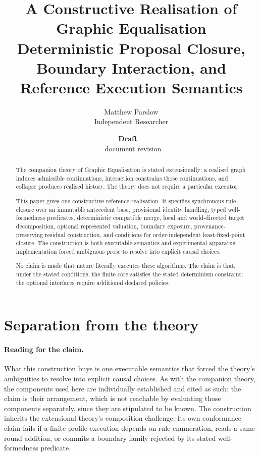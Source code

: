 \documentclass[11pt,a4paper]{article}
\title{A Constructive Realisation of Graphic Equalisation\\
\large Deterministic Proposal Closure, Boundary Interaction, and Reference Execution Semantics}
\author{Matthew Parslow\\Independent Researcher}
\date{\textbf{Draft \textemdash\ \PaperDraft}\\[2pt]\PaperDisplayDate \textbullet\ document revision \PaperRevision}
\theoremstyle{remark}
\begin{document}
\maketitle
\begin{center}
\end{center}
\vspace{1em}


\begin{abstract}
The companion theory of Graphic Equalisation is stated extensionally: a realised graph induces admissible continuations, interaction constrains those continuations, and collapse produces realised history. The theory does not require a particular executor.

This paper gives one constructive reference realisation. It specifies synchronous rule closure over an immutable antecedent base, provisional identity handling, typed well-formedness predicates, deterministic compatible merge, local and world-directed target decomposition, optional represented valuation, boundary exposure, provenance-preserving residual construction, and conditions for order-independent least-fixed-point closure. The construction is both executable semantics and experimental apparatus: implementation forced ambiguous prose to resolve into explicit causal choices.

No claim is made that nature literally executes these algorithms. The claim is that, under the stated conditions, the finite core satisfies the stated determinism constraint; the optional interfaces require additional declared policies.
\end{abstract}

\section{Separation from the theory}\label{sec:separation}

\paragraph{Reading for the claim.}
What this construction buys is one executable semantics that forced the theory's ambiguities to resolve into explicit causal choices. As with the companion theory, the components used here are individually established and cited as such; the claim is their arrangement, which is not reachable by evaluating those components separately, since they are stipulated to be known. The construction inherits the extensional theory's composition challenge. Its own conformance claim fails if a finite-profile execution depends on rule enumeration, reads a same-round addition, or commits a boundary family rejected by its stated well-formedness predicate.
\end{document}
